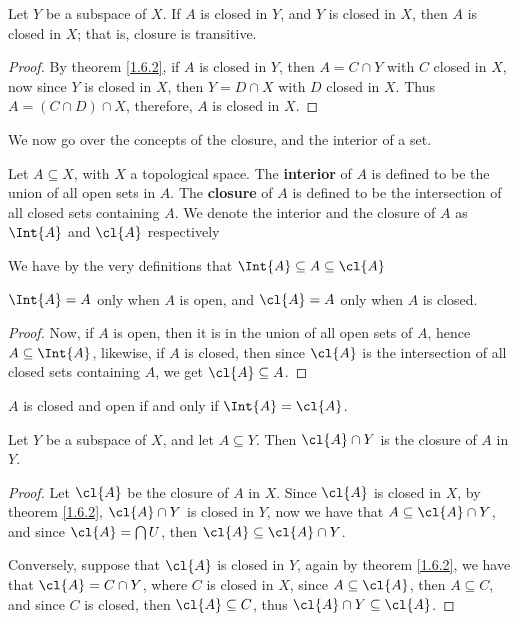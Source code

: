 \begin{theorem}\label{1.6.3}
    Let $Y$ be a subspace of  $X$. If  $A$ is closed in  $Y$, and  $Y$ is closed
    in  $X$, then  $A$ is closed in  $X$; that is, closure is transitive.
\end{theorem}
\begin{proof}
    By theorem \ref{1.6.2}, if $A$ is closed in  $Y$, then  $A=C \cap Y$ with
    $C$ closed in  $X$, now since  $Y$ is closed in  $X$, then  $Y=D \cap X$
    with  $D$ closed in  $X$. Thus  $A=(C \cap D) \cap X$, therefore,  $A$ is
    closed in  $X$.
\end{proof}

We now go over the concepts of the closure, and the interior of a set.

\begin{definition}
    Let $A \subseteq X$, with  $X$ a topological space. The  \textbf{interior}
    of $A$ is defined to be the union of all open sets in  $A$. The
    \textbf{closure} of $A$ is defined to be the intersection of all closed sets
    containing $A$. We denote the interior and the closure of  $A$ as  $\Int{A}$
    and  $\cl{A}$ respectively
\end{definition}

We have by the very definitions that $\Int{A} \subseteq A \subseteq \cl{A}$

\begin{lemma}\label{1.6.4}
    $\Int{A}=A$ only when  $A$ is open, and  $\cl{A}=A$ only when  $A$ is
    closed.
\end{lemma}
\begin{proof}
    Now, if $A$ is open, then it is in the union of all open sets of  $A$, hence
    $A \subseteq \Int{A}$, likewise, if  $A$ is closed, then since $\cl{A}$ is
    the intersection of all closed sets containing  $A$, we get $\cl{A}
    \subseteq A$.
\end{proof}
\begin{corollary}
    $A$ is closed and open if and only if  $\Int{A}=\cl{A}$.
\end{corollary}

\begin{theorem}\label{1.6.5}
    Let $Y$ be a subspace of  $X$, and let  $A \subseteq Y$. Then  $\cl{A}
    \cap Y$ is the closure of  $A$ in $Y$.
\end{theorem}
\begin{proof}
    Let $\cl{A}$ be the closure of  $A$ in  $X$. Since  $\cl{A}$ is closed in
    $X$, by theorem \ref{1.6.2},  $\cl{A} \cap Y$ is closed in  $Y$, now we
    have that $A \subseteq \cl{A} \cap Y$, and since $\cl{A}=\bigcap{U}$, then
    $\cl{A} \subseteq \cl{A} \cap Y$.

    Conversely, suppose that $\cl{A}$ is closed in  $Y$, again by theorem
    \ref{1.6.2}, we have that  $\cl{A}=C \cap Y$, where  $C$ is closed in  $X$,
    since  $A \subseteq \cl{A}$, then  $A \subseteq C$, and since  $C$ is
    closed, then  $\cl{A} \subseteq C$, thus  $\cl{A} \cap Y \subseteq
    \cl{A}$.
\end{proof}


